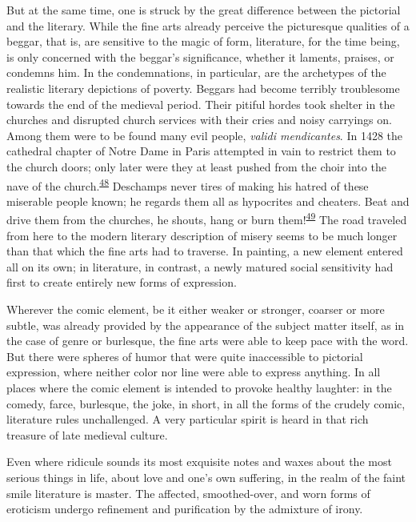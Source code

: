 But at the same time, one is struck by the great difference between the
pictorial and the literary. While the fine arts already perceive the
picturesque qualities of a beggar, that is, are sensitive to the magic
of form, literature, for the time being, is only concerned with the
beggar's significance, whether it laments, praises, or condemns him. In
the condemnations, in particular, are the archetypes of the realistic
literary depictions of poverty. Beggars had become terribly troublesome
towards the end of the medieval period. Their pitiful hordes took
shelter in the churches and disrupted church services with their cries
and noisy carryings on. Among them were to be found many evil people,
\emph{validi mendicantes}. In 1428 the cathedral chapter of Notre Dame
in Paris attempted in vain to restrict them to the church doors; only
later were they at least pushed from the choir into the nave of the
church.\textsuperscript{\protect\hypertarget{21_Chapter_Thirteen__IMAGE_AND_WORD.xhtmlux5cux23id_215}{\protect\hyperlink{23_NOTES.xhtmlux5cux23id_216}{48}}}
Deschamps never tires of making his hatred of these miserable people
known; he regards them all as hypocrites and cheaters. Beat and drive
them from the churches, he shouts, hang or burn
them!\textsuperscript{\protect\hypertarget{21_Chapter_Thirteen__IMAGE_AND_WORD.xhtmlux5cux23id_214}{\protect\hyperlink{23_NOTES.xhtmlux5cux23page_437}{49}}}
The road traveled from here to the modern literary description of misery
seems to be much longer than that which the fine arts had to traverse.
In painting, a new element entered all on its own; in literature, in
contrast, a newly matured social sensitivity had first to create
entirely new forms of expression.

Wherever the comic element, be it either weaker or stronger, coarser or
more subtle, was already provided by the appearance of the subject
matter itself, as in the case of genre or burlesque, the fine arts were
able to keep pace with the word. But there were spheres of humor that
were quite inaccessible to pictorial expression, where neither color nor
line were able to express anything. In all places where the comic
element is intended to provoke healthy laughter: in the comedy, farce,
burlesque, the joke, in short, in all the forms of the crudely comic,
literature rules unchallenged. A very particular spirit is heard in that
rich treasure of late medieval culture.

Even where ridicule sounds its most exquisite notes and waxes about the
most serious things in life, about love and one's own suffering, in the
realm of the faint smile literature is master. The
\protect\hypertarget{21_Chapter_Thirteen__IMAGE_AND_WORD.xhtmlux5cux23page_366}{}{}affected,
smoothed-over, and worn forms of eroticism undergo refinement and
purification by the admixture of irony.

